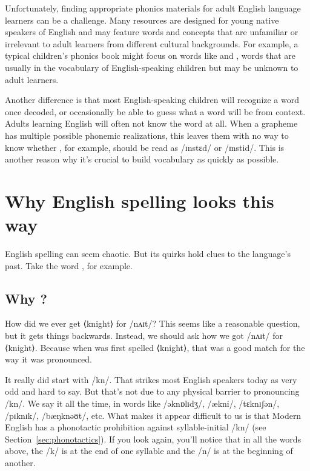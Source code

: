 Unfortunately, finding appropriate phonics materials for adult English language learners can be a challenge. Many resources are designed for young native speakers of English and may feature words and concepts that are unfamiliar or irrelevant to adult learners from different cultural backgrounds. For example, a typical children's phonics book might focus on words like    and , words that are usually in the vocabulary of English-speaking children but may be unknown to adult learners.

Another difference is that most English-speaking children will recognize a word once decoded, or occasionally be able to guess what a word will be from context. Adults learning English will often not know the word at all. When a grapheme has multiple possible phonemic realizations, this leaves them with no way to know whether , for example, should be read as /ɪnstɛd/ or /ɪnstid/. This is another reason why it's crucial to build vocabulary as quickly as possible.

\section{Why English spelling looks this way}

English spelling can seem chaotic. But its quirks hold clues to the language's past. Take the word , for example.

\subsection{Why ?}

How did we ever get ⟨knight⟩ for /nʌɪt/? This seems like a reasonable question, but it gets things backwards. Instead, we should ask how we got /nʌɪt/ for ⟨knight⟩. Because when  was first spelled ⟨knight⟩, that was a good match for the way it was pronounced.

It really did start with /kn/. That strikes most English speakers today as very odd and hard to say. But that's not due to any physical barrier to pronouncing /kn/. We say it all the time, in words like  /əknɒlɪdʒ/,  /ækni/,  /tɛknɪʃən/,  /pɪknɪk/,  /bæŋknəʊt/, etc. What makes it appear difficult to us is that Modern English has a phonotactic prohibition against syllable-initial /kn/ (see Section~\ref{sec:phonotactics}). If you look again, you'll notice that in all the words above, the /k/ is at the end of one syllable and the /n/ is at the beginning of another.

